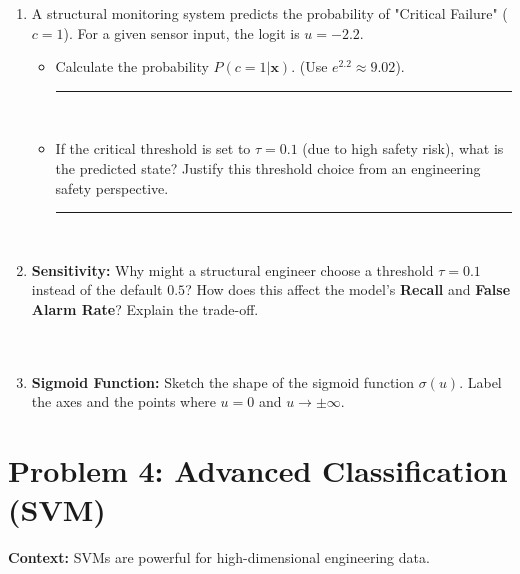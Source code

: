 \documentclass[12pt]{article}
\begin{document}
\begin{enumerate}[label=(\alph*)]
    \item A structural monitoring system predicts the probability of "Critical Failure" ($c=1$). For a given sensor input, the logit is $u = -2.2$. 
    \begin{itemize}
        \item Calculate the probability $P(c=1|\bm{x})$. (Use $e^{2.2} \approx 9.02$). \rule{1.5in}{0.15mm} \\
        \fullunderline
        \item If the critical threshold is set to $\tau = 0.1$ (due to high safety risk), what is the predicted state? Justify this threshold choice from an engineering safety perspective. \rule{1in}{0.15mm} \\
        \fullunderline
    \end{itemize}

    \item \textbf{Sensitivity:} Why might a structural engineer choose a threshold $\tau = 0.1$ instead of the default $0.5$? How does this affect the model's \textbf{Recall} and \textbf{False Alarm Rate}? Explain the trade-off. \\
    \fullunderline \\
    \fullunderline \\
    \fullunderline

    \item \textbf{Sigmoid Function:} Sketch the shape of the sigmoid function $\sigma(u)$. Label the axes and the points where $u=0$ and $u \to \pm \infty$. 
    \begin{ex-box}
    \vspace{2.5in}
    \end{ex-box}
\end{enumerate}

\section{Problem 4: Advanced Classification (SVM)}
\textbf{Context:} SVMs are powerful for high-dimensional engineering data.
\end{document}
